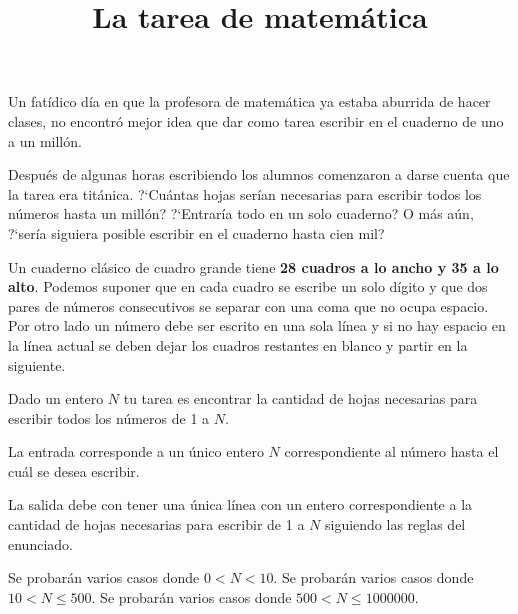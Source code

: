 \documentclass{oci}
\title{La tarea de matemática}
\begin{document}
\begin{problemDescription}
  Un fatídico día en que la profesora de matemática ya estaba aburrida de
  hacer clases, no encontró mejor idea que dar como tarea escribir en el
  cuaderno de uno a un millón.

  Después de algunas horas escribiendo los alumnos comenzaron a darse cuenta que
  la tarea era titánica.
  ?`Cuántas hojas serían necesarias para escribir todos los números hasta un
  millón?
  ?`Entraría todo en un solo cuaderno?
  O más aún, ?`sería siguiera posible escribir en el cuaderno hasta cien mil?

  Un cuaderno clásico de cuadro grande tiene \textbf{28 cuadros a lo ancho y 35
    a lo alto}.
  Podemos suponer que en cada cuadro se escribe un solo dígito y que dos pares
  de números consecutivos se separar con una coma que no ocupa espacio.
  Por otro lado un número debe ser escrito en una sola línea y si no hay espacio
  en la línea actual se deben dejar los cuadros restantes en blanco y partir en
  la siguiente.

  Dado un entero $N$ tu tarea es encontrar la cantidad de hojas necesarias para
  escribir todos los números de 1 a $N$.
\end{problemDescription}

\begin{inputDescription}
  La entrada corresponde a un único entero $N$ correspondiente al número hasta
  el cuál se desea escribir.
\end{inputDescription}

\begin{outputDescription}
  La salida debe con tener una única línea con un entero correspondiente a la
  cantidad de hojas necesarias para escribir de 1 a $N$ siguiendo las reglas del
  enunciado.
\end{outputDescription}

\begin{scoreDescription}
   Se probarán varios casos donde $0 < N < 10$.
   Se probarán varios casos donde $10 < N \leq 500$.
   Se probarán varios casos donde $500 < N \leq 1000000$.
\end{scoreDescription}

\begin{sampleDescription}
\end{sampleDescription}
\end{document}

